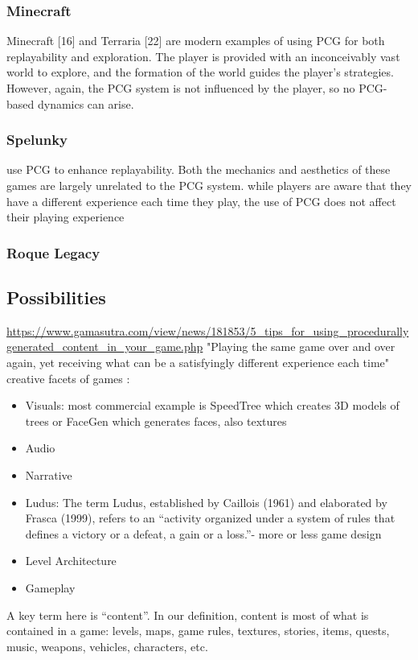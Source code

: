 \documentclass[MGS,Master,english]{twbook}%
\begin{document}
\subsubsection{Minecraft}
Minecraft [16] and Terraria [22] are modern examples of using PCG for both replayability and exploration. The player is provided with an inconceivably vast world to explore, and the formation of the world guides the player’s strategies. However, again, the PCG system is not influenced by the player, so no PCG-based dynamics can arise.\cite{pcg::endlessWeb}
\subsubsection{Spelunky}
use PCG to enhance replayability. Both the mechanics and aesthetics of these games are largely unrelated to the PCG system. while players are aware that they have a different experience each time they play, the use of PCG does not affect their playing experience
\subsubsection{Roque Legacy}
\subsection{Possibilities}
\url{https://www.gamasutra.com/view/news/181853/5_tips_for_using_procedurallygenerated_content_in_your_game.php}
"Playing the same game over and over again, yet receiving what can be a satisfyingly different experience each time"\\

creative facets of games \cite{pcg::computationalGameCreativity}:
\begin{itemize}
	\item Visuals: most commercial example is SpeedTree which creates 3D models of trees or FaceGen which generates faces, also textures
	\item Audio
	\item Narrative
	\item  Ludus: The term Ludus, established by Caillois (1961) and elaborated	by Frasca (1999), refers to an “activity organized under a	system of rules that defines a victory or a defeat, a gain or a loss.”- more or less game design
	\item Level Architecture
	\item Gameplay
\end{itemize}

A key term here is “content”. In our definition, content is most of what is contained in a game: levels, maps, game rules, textures, stories, items, quests, music, weapons, vehicles, characters, etc. \cite{pcg::book}
\end{document}
